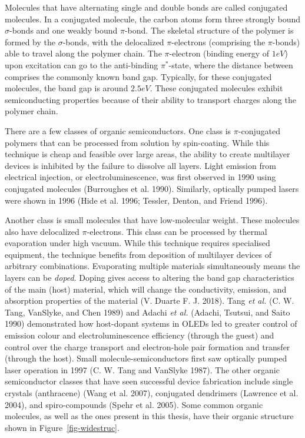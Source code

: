 \documentclass[
  letterpaper,
  DIV=11,
  numbers=noendperiod,
  oneside]{scrreprt}
\begin{document}
Molecules that have alternating single and double bonds are called
conjugated molecules. In a conjugated molecule, the carbon atoms form
three strongly bound \(\sigma\)-bonds and one weakly bound \(\pi\)-bond.
The skeletal structure of the polymer is formed by the \(\sigma\)-bonds,
with the delocalized \(\pi\)-electrons (comprising the \(\pi\)-bonds)
able to travel along the polymer chain. The \(\pi\)-electron (binding
energy of \(1 eV\)) upon excitation can go to the anti-binding
\(\pi^*\)-state, where the distance between comprises the commonly known
band gap. Typically, for these conjugated molecules, the band gap is
around \(2.5 eV\). These conjugated molecules exhibit semiconducting
properties because of their ability to transport charges along the
polymer chain.

There are a few classes of organic semiconductors. One class is
\(\pi\)-conjugated polymers that can be processed from solution by
spin-coating. While this technique is cheap and feasible over large
areas, the ability to create multilayer devices is inhibited by the
failure to dissolve all layers. Light emission from electrical
injection, or electroluminescence, was first observed in 1990 using
conjugated molecules (Burroughes et al. 1990). Similarly, optically
pumped lasers were shown in 1996 (Hide et al. 1996; Tessler, Denton, and
Friend 1996).

Another class is small molecules that have low-molecular weight. These
molecules also have delocalized \(\pi\)-electrons. This class can be
processed by thermal evaporation under high vacuum. While this technique
requires specialised equipment, the technique benefits from deposition
of multilayer devices of arbitrary combinations. Evaporating multiple
materials simultaneously means the layers can be \emph{doped}. Doping
gives access to altering the band gap characteristics of the main (host)
material, which will change the conductivity, emission, and absorption
properties of the material (V. Duarte F. J. 2018). Tang \emph{et al.}
(C. W. Tang, VanSlyke, and Chen 1989) and Adachi \emph{et al.} (Adachi,
Tsutsui, and Saito 1990) demonstrated how host-dopant systems in OLEDs
led to greater control of emission colour and electroluminescence
efficiency (through the guest) and control over the charge transport and
electron-hole pair formation and transfer (through the host). Small
molecule-semiconductors first saw optically pumped laser operation in
1997 (C. W. Tang and VanSlyke 1987). The other organic semiconductor
classes that have seen successful device fabrication include single
crystals (anthracene) (Wang et al. 2007), conjugated dendrimers
(Lawrence et al. 2004), and spiro-compounds (Spehr et al. 2005). Some
common organic molecules, as well as the ones present in this thesis,
have their organic structure shown in Figure~\ref{fig-widestruc}.
\end{document}
